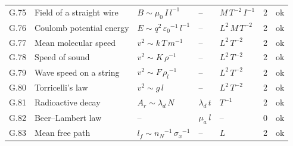 {\begin{longtable}{@{}l>{\raggedright\arraybackslash}p{3.0cm}>{\raggedright\arraybackslash}p{5.6cm}>{\raggedright\arraybackslash}p{2.0cm}>{\raggedright\arraybackslash}p{2.3cm}rl@{}}
G.75 & Field of a straight wire & $B \sim \mu_0\,I\,{l}^{-1}$ & -- & $M\,T^{-2}\,I^{-1}$ & 2 & ok \\
G.76 & Coulomb potential energy & $E \sim {q}^{2}\,{\varepsilon_0}^{-1}\,{l}^{-1}$ & -- & $L^{2}\,M\,T^{-2}$ & 2 & ok \\
G.77 & Mean molecular speed & ${v}^{2} \sim k\,T\,{m}^{-1}$ & -- & $L^{2}\,T^{-2}$ & 2 & ok \\
G.78 & Speed of sound & ${v}^{2} \sim K\,{\rho}^{-1}$ & -- & $L^{2}\,T^{-2}$ & 2 & ok \\
G.79 & Wave speed on a string & ${v}^{2} \sim F\,{\rho_l}^{-1}$ & -- & $L^{2}\,T^{-2}$ & 2 & ok \\
G.80 & Torricelli's law & ${v}^{2} \sim g\,l$ & -- & $L^{2}\,T^{-2}$ & 2 & ok \\
G.81 & Radioactive decay & $A_r \sim \lambda_d\,N$ & $\lambda_d\,t$ & $T^{-1}$ & 2 & ok \\
G.82 & Beer--Lambert law & -- & $\mu_a\,l$ & -- & 0 & ok \\
G.83 & Mean free path & $l_f \sim {n_N}^{-1}\,{\sigma_x}^{-1}$ & -- & $L$ & 2 & ok \\
\end{longtable}}
